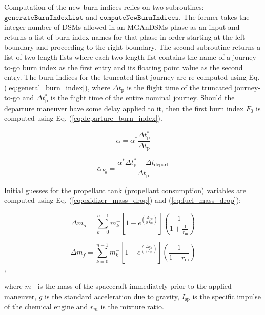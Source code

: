 \documentclass[11pt]{article}
\begin{document}
Computation of the new burn indices relies on two subroutines: $\mathtt{generateBurnIndexList}$ and $\mathtt{computeNewBurnIndices}$. The former takes the integer number of \ac{DSM}s allowed in an MGAnDSMs phase as an input and returns a list of burn index names for that phase in order starting at the left boundary and proceeding to the right boundary. The second subroutine returns a list of two-length lists where each two-length list contains the name of a journey-to-go burn index as the first entry and its floating point value as the second entry. The burn indices for the truncated first journey are re-computed using Eq. (\ref{eq:general_burn_index}), where $\Delta t_{\text{p}}$ is the flight time of the truncated journey-to-go and $\Delta t_{\text{p}}^*$ is the flight time of the entire nominal journey. Should the departure maneuver have some delay applied to it, then the first burn index $F_0$ is computed using Eq. (\ref{eq:departure_burn_index}).

\begin{equation}
\label{eq:general_burn_index}
\alpha = \alpha^* \frac{\Delta t_{\text{p}}^*}{\Delta t_{\text{p}}}
\end{equation}

\begin{equation}
\label{eq:departure_burn_index}
\alpha_{F_0} = \frac{\alpha^* \Delta t_{\text{p}}^* + \Delta t_{\text{depart}}}{\Delta t_{\text{p}}}
\end{equation}

\noindent Initial guesses for the propellant tank (propellant consumption) variables are computed using Eq. (\ref{eq:oxidizer_mass_drop}) and (\ref{eq:fuel_mass_drop}):

\begin{equation}
\label{eq:oxidizer_mass_drop}
 \Delta m_{o} = \sum_{k = 0}^{n - 1} m^{-}_k\left[1 - e^{\left(\frac{\Delta v_k}{g~I_{\text{sp}}}\right)}\right]\left(\frac{1}{1 + \frac{1}{r_{\text{m}}}}\right)
\end{equation}

\begin{equation}
\label{eq:fuel_mass_drop}
\Delta m_{f} = \sum_{k = 0}^{n - 1} m^{-}_k\left[1 - e^{\left(\frac{\Delta v_k}{g~I_{\text{sp}}}\right)}\right]\left(\frac{1}{1 + r_{\text{m}}}\right)
\end{equation},

\noindent where $m^-$ is the mass of the spacecraft immediately prior to the applied maneuver, $g$ is the standard acceleration due to gravity, $I_{\text{sp}}$ is the specific impulse of the chemical engine and $r_m$ is the mixture ratio.

%
%
\end{document}
